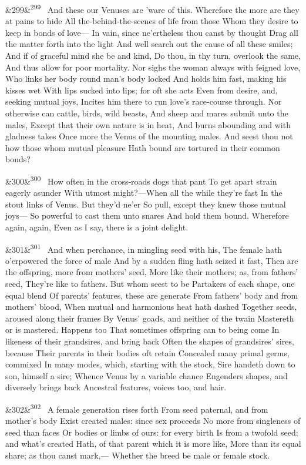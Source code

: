 \documentclass[12pt]{article}
\newcommand{\para}[1][]{\par\noindent\ifx&#1&\else\textsuperscript{\footnotesize #1}~\fi}
\begin{document}
\para[299] And these our Venuses are 'ware of this. Wherefore the more are they at pains to hide All the-behind-the-scenes of life from those Whom they desire to keep in bonds of love--- In vain, since ne'ertheless thou canst by thought Drag all the matter forth into the light And well search out the cause of all these smiles; And if of graceful mind she be and kind, Do thou, in thy turn, overlook the same, And thus allow for poor mortality. Nor sighs the woman always with feigned love, Who links her body round man's body locked And holds him fast, making his kisses wet With lips sucked into lips; for oft she acts Even from desire, and, seeking mutual joys, Incites him there to run love's race-course through. Nor otherwise can cattle, birds, wild beasts, And sheep and mares submit unto the males, Except that their own nature is in heat, And burns abounding and with gladness takes Once more the Venus of the mounting males. And seest thou not how those whom mutual pleasure Hath bound are tortured in their common bonds?

\para[300] How often in the cross-roads dogs that pant To get apart strain eagerly asunder With utmost might?---When all the while they're fast In the stout links of Venus. But they'd ne'er So pull, except they knew those mutual joys--- So powerful to cast them unto snares And hold them bound. Wherefore again, again, Even as I say, there is a joint delight.

\para[301] And when perchance, in mingling seed with his, The female hath o'erpowered the force of male And by a sudden fling hath seized it fast, Then are the offspring, more from mothers' seed, More like their mothers; as, from fathers' seed, They're like to fathers. But whom seest to be Partakers of each shape, one equal blend Of parents' features, these are generate From fathers' body and from mothers' blood, When mutual and harmonious heat hath dashed Together seeds, aroused along their frames By Venus' goads, and neither of the twain Mastereth or is mastered. Happens too That sometimes offspring can to being come In likeness of their grandsires, and bring back Often the shapes of grandsires' sires, because Their parents in their bodies oft retain Concealed many primal germs, commixed In many modes, which, starting with the stock, Sire handeth down to son, himself a sire; Whence Venus by a variable chance Engenders shapes, and diversely brings back Ancestral features, voices too, and hair.

\para[302] A female generation rises forth From seed paternal, and from mother's body Exist created males: since sex proceeds No more from singleness of seed than faces Or bodies or limbs of ours: for every birth Is from a twofold seed; and what's created Hath, of that parent which it is more like, More than its equal share; as thou canst mark,--- Whether the breed be male or female stock.
\end{document}
